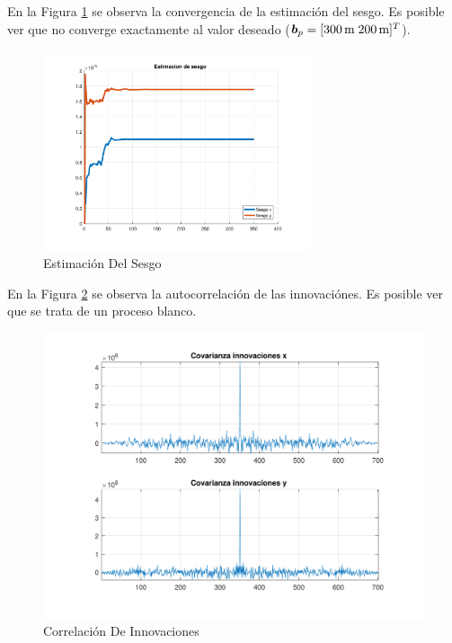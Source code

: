 	En la Figura \ref{fig:ej4a_bias} se observa la convergencia de la estimación del sesgo. Es posible ver que no converge exactamente al valor deseado ($\vect{b}_p = [\SI{300}{\m}\; \SI{200}{\m}]^T$).
	
	\begin{figure}[H]
		\centering
		\includegraphics[width=0.7\textwidth,keepaspectratio]{Figuras/bias_ej4a.pdf}
		\caption{Estimación Del Sesgo}
		\label{fig:ej4a_bias}
	\end{figure}
	
	En la Figura \ref{fig:ej4a_cov} se observa la autocorrelación de las innovaciónes. Es posible ver que se trata de un proceso blanco.
	
	\begin{figure}[H]
		\centering
		\includegraphics[width=1.0\textwidth,keepaspectratio]{Figuras/covinn_ej4a.pdf}
		\caption{Correlación De Innovaciones}
		\label{fig:ej4a_cov}
	\end{figure}
	
